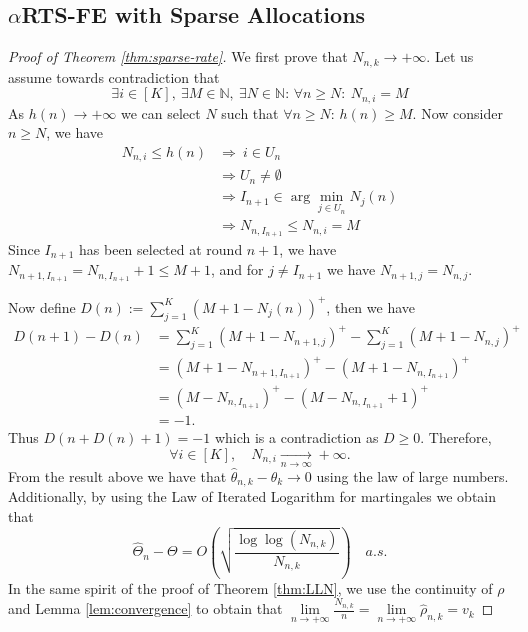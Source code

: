 \documentclass[11pt]{article}
\theoremstyle{plain}
\theoremstyle{definition}
\begin{document}
\begin{appendix}
\subsection{$\alpha$RTS-FE with Sparse Allocations}\label{proofs:sparse-case}

\begin{proof}[Proof of Theorem \ref{thm:sparse-rate}]
	We first prove that \(N_{n,k} \to +\infty\). Let us assume towards contradiction that
	\[
	\exists i \in [K],\ \exists M \in \mathbb{N},\ \exists N \in \mathbb{N}: \, \forall n \geq N:\ N_{n,i} = M
	\]
	As \(h(n) \to +\infty\) we can select \(N\) such that \(\forall n \geq N: \, h(n) \geq M \). Now consider \( n \geq N \), we have
	\begin{align*}
		N_{n,i} \leq h(n) 
		& \Rightarrow \ i \in U_n \\
		& \Rightarrow U_n \neq \emptyset \\
		& \Rightarrow I_{n+1} \in \arg\min_{j \in U_n} N_j(n) \\
		& \Rightarrow N_{n, I_{n+1}} \leq N_{n,i} = M
	\end{align*}
	Since \( I_{n+1} \) has been selected at round \( n+1 \), we have \(N_{n+1, I_{n+1}} = N_{n, I_{n+1}} + 1 \leq M + 1\), and for \( j \neq I_{n+1} \) we have \(N_{n+1,j} = N_{n,j}\). 
	
	Now define \(D(n) := \sum_{j=1}^K \left(M + 1 - N_j(n)\right)^+\), then we have
	\begin{align*}
		D(n+1) - D(n)
		&= \sum_{j=1}^K \left(M + 1 - N_{n+1, j}\right)^+ 
		- \sum_{j=1}^K \left(M + 1 - N_{n,j}\right)^+ \\
		&= \left(M + 1 - N_{n+1, I_{n+1}}\right)^+ 
		- \left(M + 1 - N_{n, I_{n+1}}\right)^+ \\
		&= \left(M - N_{n, I_{n+1}}\right)^+ 
		- \left(M - N_{n, I_{n+1}} + 1\right)^+ \\
		&= -1.
	\end{align*}
	Thus \(D\left(n + D(n) + 1\right) = -1\) which is a contradiction as \(D \geq 0\). Therefore,
	\[
	\forall i \in [K], \quad N_{n,i} \xrightarrow[n\to\infty]{} +\infty.
	\]
	From the result above we have that \(\hat{\theta}_{n,k}-\theta_k \to 0\) using the law of large numbers. Additionally, by using the Law of Iterated Logarithm for martingales we obtain that
	\[\hat{\Theta}_n - \Theta = O\left(\sqrt{\frac{\log\log(N_{n,k})}{N_{n,k}}}\right) \quad a.s.\]
	In the same spirit of the proof of Theorem \ref{thm:LLN}, we use the continuity of \(\rho\) and Lemma \ref{lem:convergence} to obtain that \(\lim\limits_{n \to +\infty} \frac{N_{n,k}}{n} = \lim\limits_{n \to +\infty} \hat{\rho}_{n,k} = v_k\)
\end{proof}


\end{appendix}
\end{document}
